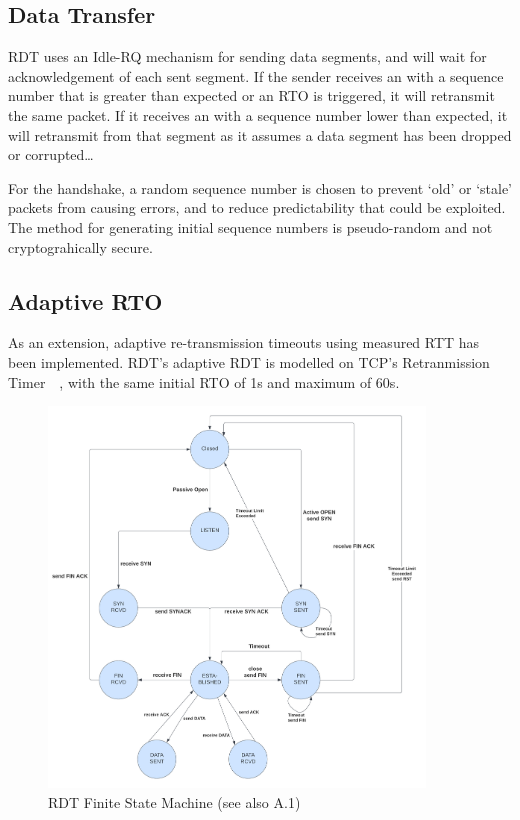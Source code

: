 \subsection{Data Transfer}

RDT uses an Idle-RQ mechanism for sending data segments, and will wait for acknowledgement of each sent segment. If the sender receives an  with a sequence number that is greater than expected or an RTO is triggered, it will retransmit the same packet. If it receives an  with a sequence number lower than expected, it will retransmit from that segment as it assumes a data segment has been dropped or corrupted\dots

For the handshake, a random sequence number is chosen to prevent `old' or `stale' packets from causing errors, and to reduce predictability that could be exploited. The method for generating initial sequence numbers is pseudo-random and not cryptograhically secure. 

\subsection{Adaptive RTO}\label{sec:RTO}
As an extension, adaptive re-transmission timeouts using measured RTT has been implemented. RDT's adaptive RDT is modelled on TCP's Retranmission Timer~\cite{rfc6298}~, with the same initial RTO of 1s and maximum of 60s.

\begin{figure}[H]
\begin{center}
    \includegraphics[width=100mm]{images/fsm.png}
\end{center}
\caption{RDT Finite State Machine (see also A.1)}\label{fig:fsm}
\end{figure}

